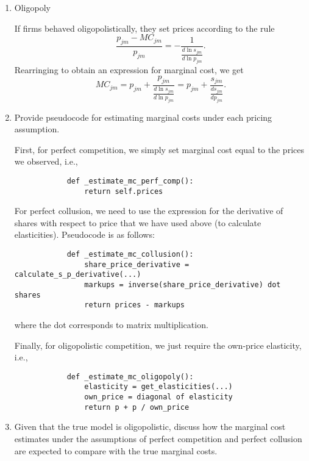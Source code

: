\documentclass{article}
\begin{document}
\begin{enumerate}
\begin{enumerate}
\begin{enumerate}
        \item Oligopoly

        \begin{answer} If firms behaved oligopolistically, they set prices according to the rule 
        \[
        \frac{p_{jm} - MC_{jm}}{p_{jm}} = - \frac{1}{\frac{d \ln s_{jm}}{d \ln p_{jm}}}.
        \]
        Rearringing to obtain an expression for marginal cost, we get
        \begin{equation}\label{p2_mc_oli}
            MC_{jm} = p_{jm} + \frac{p_{jm}}{\frac{d \ln s_{jm}}{d \ln p_{jm}}} = p_{jm} + \frac{s_{jm}}{\frac{d s_{jm}}{d p_{jm}} }.
        \end{equation}
        \end{answer}

        \item Provide pseudocode for estimating marginal costs under each pricing assumption.

        \begin{answer}
        First, for perfect competition, we simply set marginal cost equal to the prices we observed, i.e.,
        \begin{verbatim}
            def _estimate_mc_perf_comp():
                return self.prices
        \end{verbatim}

        For perfect collusion, we need to use the expression for the derivative of shares with respect to price that we have used above (to calculate elasticities). Pseudocode is as follows:
        \begin{verbatim}
            def _estimate_mc_collusion():
                share_price_derivative = calculate_s_p_derivative(...)
                markups = inverse(share_price_derivative) dot shares
                return prices - markups
        \end{verbatim}
        where the dot corresponds to matrix multiplication. 

        Finally, for oligopolistic competition, we just require the own-price elasticity, i.e., 
        \begin{verbatim}
            def _estimate_mc_oligopoly():
                elasticity = get_elasticities(...)
                own_price = diagonal of elasticity
                return p + p / own_price
        \end{verbatim}
        \end{answer}
        \item Given that the true model is oligopolistic, discuss how the marginal cost estimates under the assumptions of perfect competition and perfect collusion are expected to compare with the true marginal costs.


\end{enumerate}
\end{enumerate}
\end{enumerate}
\end{document}
